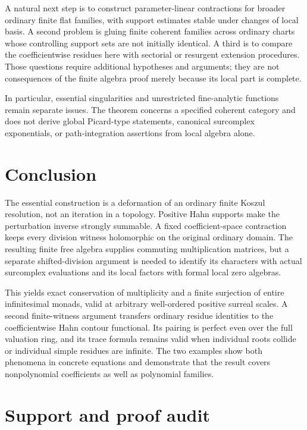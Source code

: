 \documentclass[11pt,letterpaper]{article}
\theoremstyle{definition}
\theoremstyle{remark}
\begin{document}
A natural next step is to construct parameter-linear contractions for broader ordinary finite flat families, with support estimates stable under changes of local basis. A second problem is gluing finite coherent families across ordinary charts whose controlling support sets are not initially identical. A third is to compare the coefficientwise residues here with sectorial or resurgent extension procedures. Those questions require additional hypotheses and arguments; they are not consequences of the finite algebra proof merely because its local part is complete.

In particular, essential singularities and unrestricted fine-analytic functions remain separate issues. The theorem concerns a specified coherent category and does not derive global Picard-type statements, canonical surcomplex exponentials, or path-integration assertions from local algebra alone.

\section{Conclusion}
The essential construction is a deformation of an ordinary finite Koszul resolution, not an iteration in a topology. Positive Hahn supports make the perturbation inverse strongly summable. A fixed coefficient-space contraction keeps every division witness holomorphic on the original ordinary domain. The resulting finite free algebra supplies commuting multiplication matrices, but a separate shifted-division argument is needed to identify its characters with actual surcomplex evaluations and its local factors with formal local zero algebras.

This yields exact conservation of multiplicity and a finite surjection of entire infinitesimal monads, valid at arbitrary well-ordered positive surreal scales. A second finite-witness argument transfers ordinary residue identities to the coefficientwise Hahn contour functional. Its pairing is perfect even over the full valuation ring, and its trace formula remains valid when individual roots collide or individual simple residues are infinite. The two examples show both phenomena in concrete equations and demonstrate that the result covers nonpolynomial coefficients as well as polynomial families.

\appendix
\section{Support and proof audit}
\label{app:audit}
\end{document}
